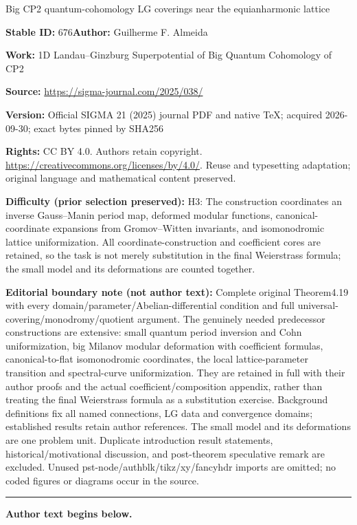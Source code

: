 \documentclass[11pt]{article}
\numberwithin{equation}{section}
\numberwithin{equation}{section}
\begin{document}
\begin{center}\Large Big CP2 quantum-cohomology LG coverings near the equianharmonic lattice\end{center}
\noindent\textbf{Stable ID:} 676\quad\textbf{Author:} Guilherme F. Almeida\par
\noindent\textbf{Work:} 1D Landau–Ginzburg Superpotential of Big Quantum Cohomology of CP2\par
\noindent\textbf{Source:} \url{https://sigma-journal.com/2025/038/}\par
\noindent\textbf{Version:} Official SIGMA 21 (2025) journal PDF and native TeX; acquired 2026-09-30; exact bytes pinned by SHA256\par
\noindent\textbf{Rights:} CC BY 4.0. Authors retain copyright. \url{https://creativecommons.org/licenses/by/4.0/}. Reuse and typesetting adaptation; original language and mathematical content preserved.\par
\noindent\textbf{Difficulty (prior selection preserved):} {\CJKfont H3: The construction coordinates an inverse Gauss–Manin period map, deformed modular functions, canonical-coordinate expansions from Gromov–Witten invariants, and isomonodromic lattice uniformization. All coordinate-construction and coefficient cores are retained, so the task is not merely substitution in the final Weierstrass formula; the small model and its deformations are counted together.}\par
\medskip\noindent\textbf{Editorial boundary note (not author text):} Complete original Theorem4.19 with every domain/parameter/Abelian-differential condition and full universal-covering/monodromy/quotient argument. The genuinely needed predecessor constructions are extensive: small quantum period inversion and Cohn uniformization, big Milanov modular deformation with coefficient formulas, canonical-to-flat isomonodromic coordinates, the local lattice-parameter transition and spectral-curve uniformization. They are retained in full with their author proofs and the actual coefficient/composition appendix, rather than treating the final Weierstrass formula as a substitution exercise. Background definitions fix all named connections, LG data and convergence domains; established results retain author references. The small model and its deformations are one problem unit. Duplicate introduction result statements, historical/motivational discussion, and post-theorem speculative remark are excluded. Unused pst-node/authblk/tikz/xy/fancyhdr imports are omitted; no coded figures or diagrams occur in the source.\par
\medskip\hrule\medskip\noindent\textbf{Author text begins below.}\par
\setcounter{section}{1}\setcounter{subsection}{0}
\end{document}
